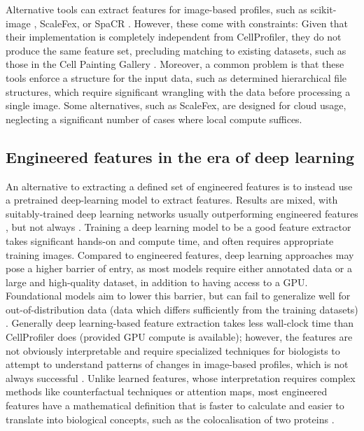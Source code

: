 \documentclass{article}
\begin{document}
Alternative tools can extract features for image-based profiles, such as scikit-image \citep{waltScikitimageImageProcessing2014}, ScaleFex, or SpaCR \citep{comoletHighlyEfficientScalable2024,einarolafssonSpaCr2025}. However, these come with constraints: Given that their implementation is completely independent from CellProfiler, they do not produce the same feature set, precluding matching to existing datasets, such as those in the Cell Painting Gallery \cite{weisbartCellPaintingGallery2024,fayRxRx3PhenomicsMap2023}. Moreover, a common problem is that these tools enforce a structure for the input data, such as determined hierarchical file structures, which require significant wrangling with the data before processing a single image. Some alternatives, such as ScaleFex, are designed for cloud usage, neglecting a significant number of cases where local compute suffices. 

\subsection{Engineered features in the era of deep learning}
\label{sec:org9dc3dfa}
An alternative to extracting a defined set of engineered features is to instead use a pretrained deep-learning model to extract features. Results are mixed, with suitably-trained deep learning networks usually outperforming engineered features \cite{lafargeCapturingSingleCellPhenotypic2019,moshkovLearningRepresentationsImagebased2022,chowPredictingDrugPolypharmacology2022,wolfSCANPYLargescaleSinglecell2018}, but not always \cite{tangMorphologicalProfilingDrug2024,kimSelfsupervisionAdvancesMorphological2023}. Training a deep learning model to be a good feature extractor takes significant hands-on and compute time, and often requires appropriate training images. Compared to engineered features, deep learning approaches may pose a higher barrier of entry, as most models require either annotated data or a large and high-quality dataset, in addition to having access to a GPU. Foundational models aim to lower this barrier, but can fail to generalize well for out-of-distribution data (data which differs sufficiently from the training datasets) \cite{azadFoundationalModelsMedical2023}. Generally deep learning-based feature extraction takes less wall-clock time than CellProfiler does (provided GPU compute is available); however, the features are not obviously interpretable and require specialized techniques for biologists to attempt to understand patterns of changes in image-based profiles, which is not always successful \citep{liChallengesOpportunitiesBioimage2023}.  Unlike learned features, whose interpretation requires complex methods like counterfactual techniques or attention maps, most engineered features have a mathematical definition that is faster to calculate and easier to translate into biological concepts, such as the colocalisation of two proteins \cite{garcia-fossaInterpretingImagebasedProfiles2023}.
\end{document}
